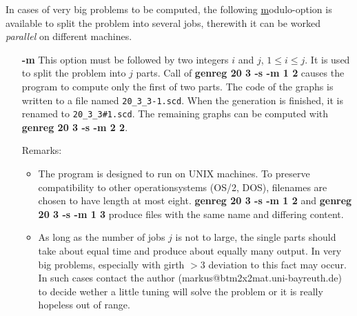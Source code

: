In cases of very  big problems to be computed, the following
\underline{m}odulo-option is available to split the problem
into several jobs, therewith it can be worked {\em parallel}
on different machines.
\begin{itemize}
 \item[\bf -m]
  This option must be followed by two integers $i$ and $j$, 
  $1\le i\le j$. It is used to split the problem into $j$ parts.
  Call of {\bf genreg 20 3 -s -m 1 2} causes the program
  to compute only the first of two parts. The code of the graphs
  is written to a file named \verb|20_3_3-1.scd|. When the 
  generation is finished, it is renamed to \verb|20_3_3#1.scd|.
  The remaining graphs can be computed with {\bf genreg 20 3 -s -m 2 2}.

  Remarks:
 
  \begin{itemize}
   \item
    The program is designed to run on UNIX machines.
    To preserve compatibility to other operationsystems 
    (OS/2, DOS), filenames are chosen to have
    length at most eight. {\bf genreg 20 3 -s -m 1 2} and
    {\bf genreg 20 3 -s -m 1 3} produce files with the same
    name and differing content.

   \item
    As long as the number of jobs $j$ is not to large, the 
    single parts should take about equal time and produce about
    equally many output. In very big problems, especially
    with girth $>3$ deviation to this fact may occur.  
    In such cases contact the author 
    (markus@btm2x2mat.uni-bayreuth.de) 
    to decide wether a little tuning will solve the problem
    or it is really hopeless out of  range.
  \end{itemize}
\end{itemize}  
  
  
 
